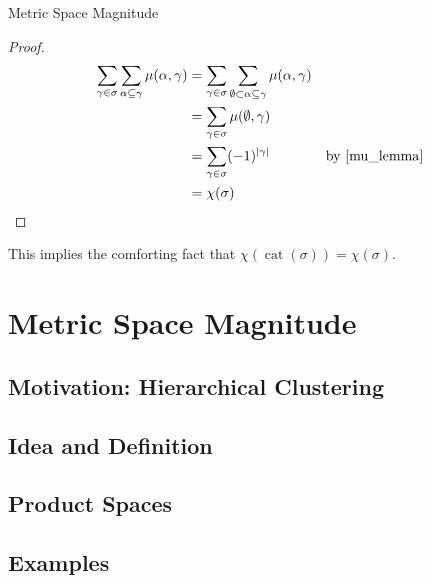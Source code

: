 \documentclass[12pt]{pom_thesis}
\DeclareMathOperator{\cat}{cat}
\begin{document}
\begin{chapter}{Metric Space Magnitude}
\begin{thm}
\end{thm}
\begin{proof}

\begin{align*}
\sum_{\gamma \in \sigma} \sum_{\alpha \subseteq \gamma} \mu(\alpha, \gamma) &= \sum_{\gamma \in \sigma} \sum_{\emptyset \subset \alpha \subseteq \gamma} \mu(\alpha, \gamma)\\
&= \sum_{\gamma \in \sigma} \mu(\emptyset, \gamma)\\
&= \sum_{\gamma \in \sigma} (-1)^{|\gamma|} &\text{by \ref{mu_lemma}}\\
&= \chi(\sigma)
\end{align*}
\end{proof}
This implies the comforting fact that $\chi(\cat(\sigma)) = \chi(\sigma)$.
\section{Metric Space Magnitude}
\subsection{Motivation: Hierarchical Clustering}
\subsection{Idea and Definition}
\subsection{Product Spaces}
\subsection{Examples}
\end{chapter}







\iffalse
\iffalse
We can replace the vectors $f,g$ with matrices to get the following generalization, which :
\begin{thm}[Two Variable M\"obius Inversion]\label{mob_inv_old}
Let $X$ be a lower finite poset.  Let $f,g:X \times X \rightarrow \Rr$ be given. Let $\zeta:X \times X \rightarrow \Rr$ be defined as usual, and let $\mu = \zeta^{-1}$. Then:
\begin{align*}
f = g \zeta &\iff g = f \mu;\\
f = \zeta g &\iff g = \mu f.
\end{align*}
Equivalently,
\begin{align*}
\forall x,y \in X, f(x,y) = \sum_{z \in X}g(x,z)\zeta(z,y) &\iff \forall x,y \in X, g(x,y) = \sum_{z \in X}f(x,z)\mu(z,y);\\
\forall x,y \in X, f(x,y) = \sum_{z \in X}\zeta(x,z)g(z,y) &\iff \forall x,y \in X, g(x,y) = \sum_{z \in X}\mu(x,z)f(z,y).
\end{align*}
\begin{proof}
Again, the result is trivial when we treat $f,g,\zeta,\mu$ as matrices.
\end{proof}
\end{thm}
\fi
\end{document}
